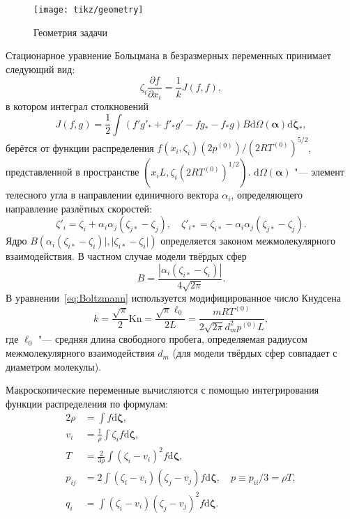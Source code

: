 \documentclass[a4paper,12pt]{article}
\newcommand{\Kn}{\mathrm{Kn}}
\newcommand{\dd}{\mathrm{d}}
\newcommand{\pder}[2][]{\frac{\partial#1}{\partial#2}}
\begin{document}
\begin{figure}[ht]
    \centering
    \texttt{[image: tikz/geometry]}
    \caption{Геометрия задачи}
    \label{fig:geometry}
\end{figure}

Стационарное уравнение Больцмана в безразмерных переменных принимает следующий вид:
\begin{equation}\label{eq:Boltzmann}
    \zeta_i\pder[f]{x_i} = \frac1k J(f,f),
\end{equation}
в котором интеграл столкновений
\begin{equation}
    J(f,g) = \frac12 \int (f'g'_* + f'_*g' - fg_* - f_*g) B
    \dd \Omega(\boldsymbol{\alpha}) \boldsymbol{\dd \zeta_*},
\end{equation}
берётся от функции распределения \(f(x_i,\zeta_i)(2p^{(0)})/(2RT^{(0)})^{5/2}\), представленной
в пространстве \((x_iL, \zeta_i(2RT^{(0)})^{1/2})\).
\(\dd \Omega(\boldsymbol{\alpha})\) "--- элемент телесного угла в направлении единичного вектора \(\alpha_i\),
определяющего направление разлётных скоростей:
\[
    \zeta'_i = \zeta_i + \alpha_i\alpha_j(\zeta_{j*}-\zeta_j), \quad
    \zeta'_{i*} = \zeta_{i*} - \alpha_i\alpha_j(\zeta_{j*}-\zeta_j).
\]
Ядро \(B(\alpha_i(\zeta_{i*}-\zeta_i)|,|\zeta_{i*}-\zeta_i|)\)
определяется законом межмолекулярного взаимодействия.
В частном случае модели твёрдых сфер
\begin{equation}
    B = \frac{|\alpha_i(\zeta_{i*}-\zeta_i)|}{4\sqrt{2\pi}}.
\end{equation}
В уравнении~\eqref{eq:Boltzmann} используется модифицированное число Кнудсена
\begin{equation}
    k = \frac{\sqrt\pi}2 \Kn = \frac{\sqrt\pi\ell_0}{2L} =
    \frac{mRT^{(0)}}{2\sqrt{2\pi} d_m^2p^{(0)}L},
\end{equation}
где \(\ell_0\) "--- средняя длина свободного пробега, определяемая радиусом межмолекулярного
взаимодействия \(d_m\) (для модели твёрдых сфер совпадает с диаметром молекулы).

Макроскопические переменные вычисляются с помощью интегрирования функции распределения по формулам:
\begin{alignat*}{2}
    \rho &= \int f \boldsymbol{\dd\zeta}, \\
    v_i &= \frac1{\rho} \int \zeta_i f \boldsymbol{\dd\zeta}, \\
    T &= \frac{2}{3\rho}\int(\zeta_i-v_i)^2 f \boldsymbol{\dd\zeta}, \\
    p_{ij} &= 2 \int(\zeta_i-v_i)(\zeta_j-v_j) f \boldsymbol{\dd\zeta},
        \quad p \equiv p_{ii}/3 = \rho T, \\
    q_i &= \int(\zeta_i-v_i)(\zeta_j-v_j)^2 f \boldsymbol{\dd\zeta}.
\end{alignat*}
\end{document}

